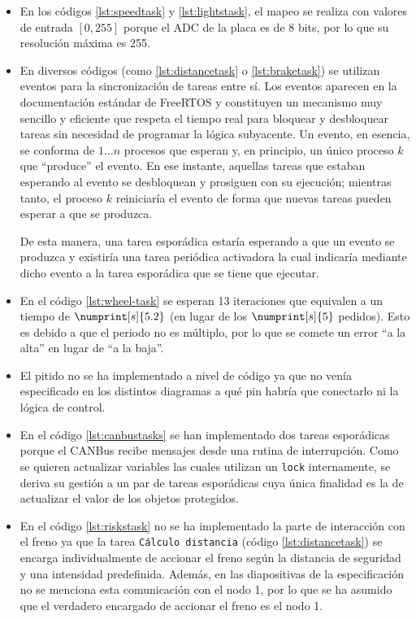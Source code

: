 \begin{itemize}
  \item En los códigos \ref{lst:speedtask} y \ref{lst:lightstask}, el mapeo se realiza con valores
        de entrada $\left[0, 255\right]$ porque el ADC de la placa
        es de 8 bits, por lo que su resolución máxima es 255.
  \item En diversos códigos (como \ref{lst:distancetask} o \ref{lst:braketask}) se
        utilizan eventos para la sincronización de tareas entre sí. Los eventos
        aparecen en la documentación estándar de FreeRTOS y constituyen un mecanismo
        muy sencillo y eficiente que respeta el tiempo real para bloquear y desbloquear
        tareas sin necesidad de programar la lógica subyacente. Un evento, en esencia,
        se conforma de $1 \dots n$ procesos que esperan y, en principio, un único proceso
        $k$ que ``produce'' el evento. En ese instante, aquellas tareas que estaban
        esperando al evento se desbloquean y prosiguen con su ejecución; mientras tanto,
        el proceso $k$ reiniciaría el evento de forma que nuevas tareas pueden esperar
        a que se produzca.

        De esta manera, una tarea esporádica estaría esperando a que un evento se
        produzca y existiría una tarea periódica activadora la cual indicaría
        mediante dicho evento a la tarea esporádica que se tiene que ejecutar.
  \item En el código \ref{lst:wheel-task} se esperan 13 iteraciones que equivalen a un
        tiempo de $\numprint[s]{5.2}$ (en lugar de los $\numprint[s]{5}$ pedidos). Esto
        es debido a que el periodo no es múltiplo, por lo que se comete un error
        ``a la alta'' en lugar de ``a la baja''.
  \item El pitido no se ha implementado a nivel de código ya que no venía especificado
        en los distintos diagramas a qué pin habría que conectarlo ni la lógica de
        control.
  \item En el código \ref{lst:canbustasks} se han implementado dos tareas esporádicas
        porque el CANBus recibe mensajes desde una rutina de interrupción. Como se quieren
        actualizar variables las cuales utilizan un \texttt{lock} internamente, se
        deriva su gestión a un par de tareas esporádicas cuya única finalidad es la
        de actualizar el valor de los objetos protegidos.
  \item En el código \ref{lst:riskstask} no se ha implementado la parte de interacción
        con el freno ya que la tarea \texttt{Cálculo distancia} (código \ref{lst:distancetask})
        se encarga individualmente de accionar el freno según la distancia de seguridad
        y una intensidad predefinida. Además, en las diapositivas de la especificación
        no se menciona esta comunicación con el nodo 1, por lo que se ha asumido que
        el verdadero encargado de accionar el freno es el nodo 1.
\end{itemize}